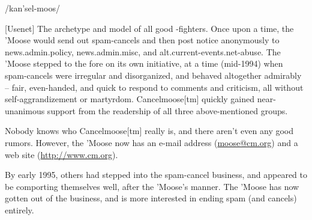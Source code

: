  /kan'sel-moos/

[Usenet] The archetype and model of all good -fighters. Once
upon a time, the 'Moose would send out spam-cancels and then post notice
anonymously to news.admin.policy, news.admin.misc, and
alt.current-events.net-abuse. The 'Moose stepped to the fore on its own
initiative, at a time (mid-1994) when spam-cancels were irregular and
disorganized, and behaved altogether admirably --  fair,
even-handed, and quick to respond to comments and criticism, all without
self-aggrandizement or martyrdom. Cancelmoose[tm] quickly gained near-unanimous
support from the readership of all three above-mentioned groups.

Nobody knows who Cancelmoose[tm] really is, and there aren't even any good
rumors. However, the 'Moose now has an e-mail address (\url{moose@cm.org}) and a
web site (\url{http://www.cm.org}).

By early 1995, others had stepped into the spam-cancel business, and appeared to
be comporting themselves well, after the 'Moose's manner. The 'Moose has now
gotten out of the business, and is more interested in ending spam (and cancels)
entirely.


